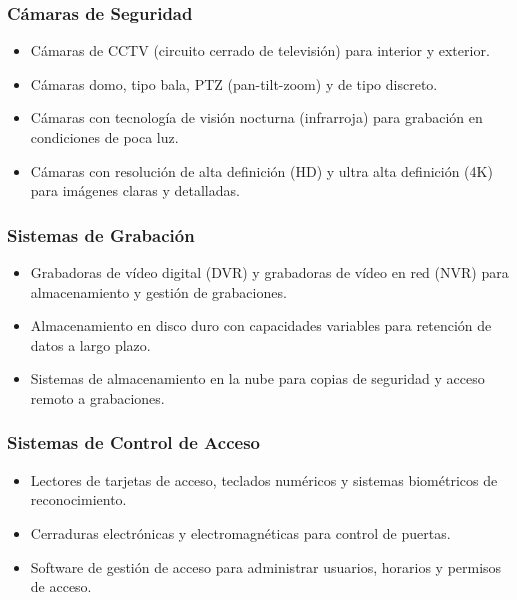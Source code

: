 \documentclass{report}
\begin{document}
            \subsubsection*{Cámaras de Seguridad}
              \begin{itemize}
                \item Cámaras de CCTV (circuito cerrado de televisión) para interior y exterior.
                \item Cámaras domo, tipo bala, PTZ (pan-tilt-zoom) y de tipo discreto.
                \item Cámaras con tecnología de visión nocturna (infrarroja) para grabación en condiciones de poca luz.
                \item Cámaras con resolución de alta definición (HD) y ultra alta definición (4K) para imágenes claras y detalladas.
              \end{itemize}
            \subsubsection*{Sistemas de Grabación}
              \begin{itemize}
                \item Grabadoras de vídeo digital (DVR) y grabadoras de vídeo en red (NVR) para almacenamiento y gestión de grabaciones.
                \item Almacenamiento en disco duro con capacidades variables para retención de datos a largo plazo.
                \item Sistemas de almacenamiento en la nube para copias de seguridad y acceso remoto a grabaciones.
              \end{itemize}
            \subsubsection*{Sistemas de Control de Acceso}
              \begin{itemize}
                \item Lectores de tarjetas de acceso, teclados numéricos y sistemas biométricos de reconocimiento.
                \item Cerraduras electrónicas y electromagnéticas para control de puertas.
                \item Software de gestión de acceso para administrar usuarios, horarios y permisos de acceso.
              \end{itemize}
\end{document}
